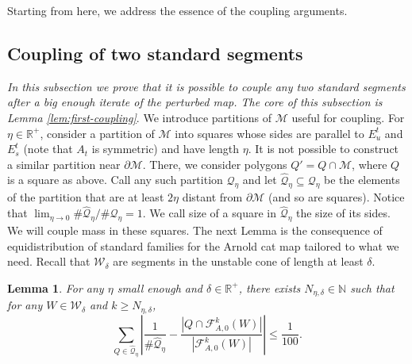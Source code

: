 \documentclass{amsart}
\numberwithin{equation}{section}
\newtheorem{lemma}[theorem]{Lemma}
\renewcommand{\ge}{\geqslant}
\renewcommand{\le}{\leqslant}
\newcommand\cF{{\mathcal F}}
\newcommand\cM{{\mathcal M}}
\newcommand\cQ{{\mathcal Q}}
\newcommand\cW{{\mathcal W}}
\newcommand\bN{{\mathbb N}}
\newcommand\bR{{\mathbb R}}
\newcommand{\cato}{\cF_{A,0}}
\begin{document}
Starting from here, we address the essence of the coupling arguments.

\subsection{Coupling of two standard segments}\label{subsec:coup-segments} \textit{In this subsection we prove that it is possible to couple any two standard segments after a big enough iterate of the perturbed map. The core of this subsection is Lemma \ref{lem:first-coupling}}. We introduce partitions of \(\cM\) useful for coupling. For \(\eta \in \bR^+\), consider a partition of \(\cM\) into squares whose sides are parallel to \(E_u^t\) and \(E_s^t\) (note that \(A_t\) is symmetric) and have length \(\eta\). It is not possible to construct a similar partition near \(\partial \cM\). There, we consider polygons \(Q' = Q \cap \cM\), where \(Q\) is a square as above. Call any such partition \(\cQ_\eta\) and let \(\widehat \cQ_\eta \subseteq \cQ_\eta\) be the elements of the partition that are at least \(2\eta\) distant from \(\partial \cM\) (and so are squares). Notice that \(\lim_{\eta \to 0}\#\widehat \cQ_\eta /\#\cQ_\eta = 1\). We call size of a square in \(\widehat\cQ_\eta\) the size of its sides. We will couple mass in these squares. The next Lemma is the consequence of equidistribution of standard families for the Arnold cat map tailored to what we need. Recall that \(\cW_\delta\) are segments in the unstable cone of length at least \(\delta\).
\begin{lemma}\label{lem:unp-density}
  For any \(\eta\) small enough and  \(\delta \in \bR^+\), there exists \(N_{\eta,\delta}\in \bN\) such that for any \(W \in \cW_{\delta}\) and \(k \ge N_{\eta, \delta}\),
\[
   \sum_{Q \in \widehat \cQ_{\eta}} \left| \frac{1}{\# \widehat \cQ_{\eta}} - \frac{\left|Q \cap \cato^k(W)\right|}{\left|\cato^k(W) \right|}\right| \le \frac{1}{100}.
\]
\end{lemma}
\end{document}
